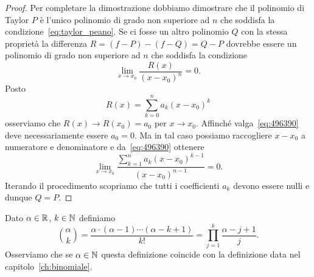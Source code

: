 \begin{proof}
Per completare la dimostrazione dobbiamo dimostrare che il polinomio di 
Taylor $P$ è l'unico polinomio di grado non superiore ad $n$ che soddisfa 
la condizione~\eqref{eq:taylor_peano}.
Se ci fosse un altro polinomio $Q$ con la stessa proprietà la differenza 
$R=(f-P)-(f-Q)=Q-P$ dovrebbe essere un polinomio di grado 
non superiore ad $n$ che soddisfa la condizione 
\begin{equation}\label{eq:496390}
  \lim_{x\to x_0}\frac{R(x)}{(x-x_0)^n}=0.  
\end{equation}
Posto 
\[
  R(x) = \sum_{k=0}^n a_k (x-x_0)^k  
\]
osserviamo che $R(x)\to R(x_0) = a_0$ per $x\to x_0$. 
Affinché valga~\eqref{eq:496390} deve necessariamente 
essere $a_0 = 0$.
Ma in tal caso possiamo raccogliere $x-x_0$ a numeratore 
e denominatore e da~\eqref{eq:496390} ottenere 
\[
  \lim_{x\to x_0}\frac{\displaystyle \sum_{k=1}^n a_k (x-x_0)^{k-1}}{(x-x_0)^{n-1}}=0.  
\]
Iterando il procedimento scopriamo che tutti i coefficienti $a_k$ 
devono essere nulli e dunque $Q=P$.
\end{proof}

\begin{definition}
\label{def:binomiale_reale}%
\mymark{***}%
Dato $\alpha \in {\mathbb R}$, $k \in {\mathbb N}$ definiamo
\[
 {\alpha \choose k } 
 = \frac{\alpha \cdot (\alpha-1) \cdots (\alpha -k +1)}{k!}
 = \prod_{j=1}^k \frac{\alpha-j+1}{j}.
\]
Osserviamo che se $\alpha \in {\mathbb N}$ questa definizione coincide
con la definizione data nel capitolo~\ref{ch:binomiale}.
\end{definition}

